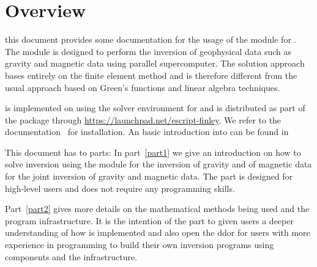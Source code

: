 
%
%
%


\chapter*{Overview}\label{sec:Intro}
this document provides some documentation for the 
usage of the \downunder module for \python. The module is 
designed to perform the inversion of geophysical data such as gravity and magnetic 
data using parallel supercomputer. The solution approach bases entirely on the
finite element method and is therefore different from the usual approach based on Green's functions
and linear algebra techniques. 

\downunder is implemented on using the \escript solver environment for \python and 
is distributed as part of the \escript package through \url{https://launchpad.net/escript-finley}. We refer 
to the \escript documentation~\cite{ESCRIPT} for installation. An basic introduction
into \escript can be found in~\cite{ESCRIPTCOOKBOOK}

This document has to parts: In part~\ref{part1} we give an introduction on how to solve inversion
using the \downunder module for the inversion of gravity and of magnetic data
for the joint inversion of gravity and magnetic data. The part is designed for high-level users and does not
require any programming skills. 

Part~\ref{part2} gives more details on the mathematical methods being used and the 
program infrastructure. It is the intention of the part to given users a deeper understanding of how
\downunder is implemented and also open the ddor for users with more experience in \python programming 
to build their own inversion programs using \downunder components and the \escript infrastructure. 






